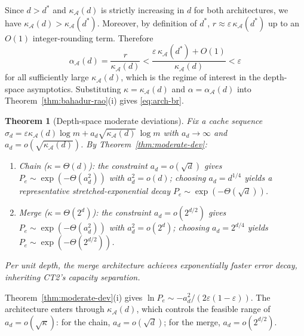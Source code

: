 \documentclass[journal]{IEEEtran}
\makeatletter
\newtheorem{theorem}{Theorem}[section]
\numberwithin{equation}{section}
\renewenvironment{proof}[1][\proofname]{\par
  \pushQED{\qed}%
  \normalfont \topsep6\p@\@plus6\p@\relax
  \trivlist
  \item[\hskip\labelsep
        \itshape
    #1\@addpunct{.}]\ignorespaces
}{%
  \popQED\endtrivlist\@endpefalse
}
\makeatother
\begin{document}
\begin{proof}
Since \(d>d^*\) and \(\kappa_{\mathcal A}(d)\) is strictly increasing in \(d\) for both
architectures, we have \(\kappa_{\mathcal A}(d)>\kappa_{\mathcal A}(d^*)\).
Moreover, by definition of \(d^*\), \(r\approx \varepsilon\,\kappa_{\mathcal A}(d^*)\) up to an \(O(1)\)
integer-rounding term. Therefore
\[
  \alpha_{\mathcal A}(d)=\frac{r}{\kappa_{\mathcal A}(d)}
  < \frac{\varepsilon\,\kappa_{\mathcal A}(d^*)+O(1)}{\kappa_{\mathcal A}(d)}
  < \varepsilon
\]
for all sufficiently large \(\kappa_{\mathcal A}(d)\), which is the regime of interest in the
depth-space asymptotics. Substituting \(\kappa=\kappa_{\mathcal A}(d)\) and
\(\alpha=\alpha_{\mathcal A}(d)\) into Theorem~\ref{thm:bahadur-rao}\textup{(i)} gives
\eqref{eq:arch-br}.
\end{proof}

\begin{theorem}[Depth-space moderate deviations]
\label{thm:arch-mod-dev}
Fix a cache sequence
$\sigma_d=\varepsilon\kappa_{\mathcal A}(d)\log m
+a_d\sqrt{\kappa_{\mathcal A}(d)}\,\log m$
with $a_d\to\infty$ and
$a_d=o(\sqrt{\kappa_{\mathcal A}(d)})$.
By Theorem~\textup{\ref{thm:moderate-dev}}:
\begin{enumerate}[label=\textup{(\alph*)}]
\item Chain \textup{($\kappa=\Theta(d)$)}:
the constraint $a_d=o(\sqrt d)$ gives
$P_e\sim\exp(-\Theta(a_d^2))$ with
$a_d^2=o(d)$;
choosing $a_d=d^{1/4}$ yields a representative
stretched-exponential decay
$P_e\sim\exp(-\Theta(\sqrt d))$.

\item Merge \textup{($\kappa=\Theta(2^d)$)}:
the constraint $a_d=o(2^{d/2})$ gives
$P_e\sim\exp(-\Theta(a_d^2))$ with
$a_d^2=o(2^d)$;
choosing $a_d=2^{d/4}$ yields
$P_e\sim\exp(-\Theta(2^{d/2}))$.
\end{enumerate}
Per unit depth, the merge architecture achieves
exponentially faster error decay, inheriting CT2's
capacity separation.
\end{theorem}

\begin{proof}
Theorem~\ref{thm:moderate-dev}(i) gives
$\ln P_e\sim-a_d^2/(2\varepsilon(1{-}\varepsilon))$.
The architecture enters through
$\kappa_{\mathcal A}(d)$, which controls the feasible
range of $a_d=o(\sqrt\kappa)$: for the chain,
$a_d=o(\sqrt d)$; for the merge,
$a_d=o(2^{d/2})$.
\end{proof}

\end{document}

